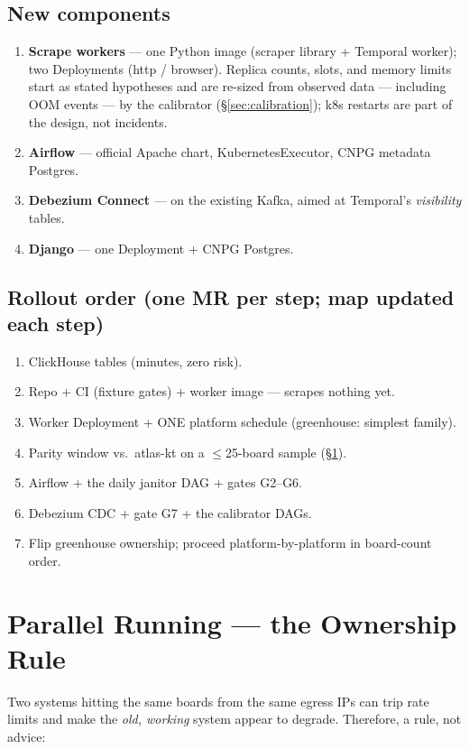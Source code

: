 \documentclass[11pt,a4paper]{article}
\begin{document}
\subsection{New components}
\begin{enumerate}
\item \textbf{Scrape workers} --- one Python image (scraper library + Temporal worker); two Deployments
(http / browser). Replica counts, slots, and memory limits start as stated hypotheses and are re-sized
from observed data --- including OOM events --- by the calibrator (\S\ref{sec:calibration}); k8s restarts
are part of the design, not incidents.
\item \textbf{Airflow} --- official Apache chart, KubernetesExecutor, CNPG metadata Postgres.
\item \textbf{Debezium Connect} --- on the existing Kafka, aimed at Temporal's \emph{visibility} tables.
\item \textbf{Django} --- one Deployment + CNPG Postgres.
\end{enumerate}

\subsection{Rollout order (one MR per step; map updated each step)}
\begin{enumerate}
\item ClickHouse tables (minutes, zero risk).
\item Repo + CI (fixture gates) + worker image --- scrapes nothing yet.
\item Worker Deployment + ONE platform schedule (greenhouse: simplest family).
\item Parity window vs.\ atlas-kt on a $\leq$25-board sample (\S\ref{sec:ownership}).
\item Airflow + the daily janitor DAG + gates G2--G6.
\item Debezium CDC + gate G7 + the calibrator DAGs.
\item Flip greenhouse ownership; proceed platform-by-platform in board-count order.
\end{enumerate}

\section{Parallel Running --- the Ownership Rule}
\label{sec:ownership}

Two systems hitting the same boards from the same egress IPs can trip rate limits and make the \emph{old,
working} system appear to degrade. Therefore, a rule, not advice:
\end{document}
